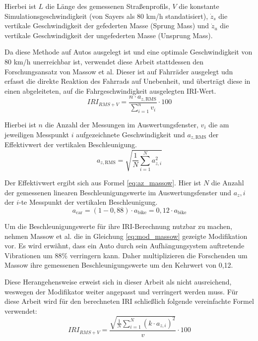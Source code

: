 Hierbei ist $L$ die Länge des gemessenen Straßenprofils, $V$ die konstante Simulationsgeschwindigkeit (von Sayers als 80 km/h standatisiert), $\dot{z}_s$ die vertikale Geschwindigkeit der gefederten Masse (Sprung Mass) und $\dot{z}_u$ die vertikale Geschwindigkeit der ungefederten Masse (Unsprung Mass). \cite{Sayers1995}

Da diese Methode auf Autos ausgelegt ist und eine optimale Geschwindigkeit von 80 km/h unerreichbar ist, verwendet diese Arbeit stattdessen den Forschungsansatz von Massow et al. Dieser ist auf Fahrräder ausgelegt udn erfasst die direkte Reaktion des Fahrrads auf Unebenheit, und überträgt diese in einen abgeleiteten, auf die Fahrgeschwindigkeit ausgelegten IRI-Wert. \cite{Massow2024}
\begin{equation}
    IRI_{RMS+V} = \frac{n \cdot a_{z, \text{RMS}}}{\sum_{i=1}^{n} v_i} \cdot 100
    \label{eq:iri_massow}
\end{equation}

Hierbei ist $n$ die Anzahl der Messungen im Auswertungsfenster, $v_i$ die am jeweiligen Messpunkt $i$ aufgezeichnete Geschwindigkeit und $a_{z, \text{RMS}}$ der Effektivwert der vertikalen Beschleunigung. \cite{Massow2024}
\begin{equation}
    a_{z, \text{RMS}} = \sqrt{\frac{1}{N} \sum_{i=1}^{N} a_{z,i}^2}
    \label{eq:az_massow}
\end{equation}

Der Effektivwert ergibt sich aus Formel \ref{eq:az_massow}. Hier ist $N$ die Anzahl der gemessenen linearen Beschleunigungswerte im Auswertungsfenster und $a_z,i$ der $i$-te Messpunkt der vertikalen Beschleunigung.
\begin{equation}
    a_{\text{car}} = (1 - 0{,}88) \cdot a_{\text{bike}} = 0{,}12 \cdot a_{\text{bike}}
    \label{eq:mod_massow}
\end{equation}

Um die Beschleunigungswerte für ihre IRI-Berechnung nutzbar zu machen, nehmen Massow et al. die in Gleichung \ref{eq:mod_massow} gezeigte Modifikation vor. Es wird erwähnt, dass ein Auto durch sein Aufhängungsystem auftretende Vibrationen um 88\% verringern kann. Daher multiplizieren die Forschenden um Massow ihre gemessenen Beschleunigungswerte um den Kehrwert von 0,12. \cite{Massow2024}

Diese Herangehensweise erweist sich in dieser Arbeit als nicht ausreichend, weswegen der Modifikator weiter angepasst und verringert werden muss. Für diese Arbeit wird für den berechneten IRI schließlich folgende vereinfachte Formel verwendet:
\begin{equation}
    IRI_{RMS+V} = \frac{\sqrt{\frac{1}{N} \sum_{i=1}^{N} (k \cdot  a_{z,i})^2}}{v} \cdot 100
    \label{eq:iri_simple}
\end{equation} 

